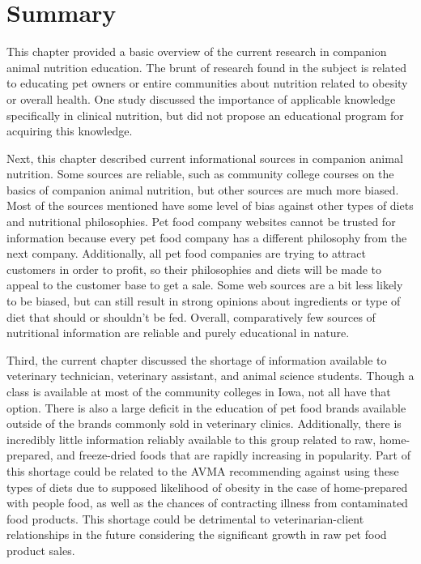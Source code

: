 \section{Summary}
This chapter provided a basic overview of the current research in companion animal nutrition education. The brunt of research found in the subject is related to educating pet owners or entire communities about nutrition related to obesity or overall health\citep{yaissle,chauvet,constable}. One study discussed the importance of applicable knowledge specifically in clinical nutrition, but did not propose an educational program for acquiring this knowledge\citep{roud2}.
\par Next, this chapter described current informational sources in companion animal nutrition. Some sources are reliable, such as community college courses on the basics of companion animal nutrition, but other sources are much more biased. Most of the sources mentioned have some level of bias against other types of diets and nutritional philosophies. Pet food company websites cannot be trusted for information because every pet food company has a different philosophy from the next company. Additionally, all pet food companies are trying to attract customers in order to profit, so their philosophies and diets will be made to appeal to the customer base to get a sale. Some web sources are a bit less likely to be biased, but can still result in strong opinions about ingredients or type of diet that should or shouldn't be fed. Overall, comparatively few sources of nutritional information are reliable and purely educational in nature.
\par Third, the current chapter discussed the shortage of information available to veterinary technician, veterinary assistant, and animal science students. Though a class is available at most of the community colleges in Iowa, not all have that option. There is also a large deficit in the education of pet food brands available outside of the brands commonly sold in veterinary clinics. Additionally, there is incredibly little information reliably available to this group related to raw, home-prepared, and freeze-dried foods that are rapidly increasing in popularity\citep{oconnor}. Part of this shortage could be related to the AVMA recommending against using these types of diets due to supposed likelihood of obesity in the case of home-prepared with people food\citep{burns}, as well as the chances of contracting illness from contaminated food products\citep{oconnor}. This shortage could be detrimental to veterinarian-client relationships in the future considering the significant growth in raw pet food product sales\citep{oconnor}.

